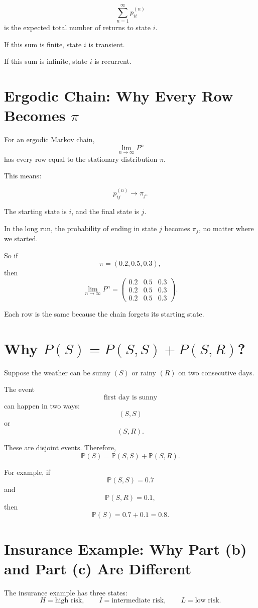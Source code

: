\documentclass[12pt,a4paper]{article}
\theoremstyle{notestyle}
\newcommand{\Prob}{\mathbb{P}}
\begin{document}
\[
\sum_{n=1}^{\infty}p_{ii}^{(n)}
\]
is the expected total number of returns to state $i$.

If this sum is finite, state $i$ is transient.

If this sum is infinite, state $i$ is recurrent.

\section{Ergodic Chain: Why Every Row Becomes $\pi$}

For an ergodic Markov chain,
\[
\lim_{n\to\infty}P^n
\]
has every row equal to the stationary distribution $\pi$.

This means:

\[
p_{ij}^{(n)}\to \pi_j.
\]

The starting state is $i$, and the final state is $j$.

In the long run, the probability of ending in state $j$ becomes $\pi_j$, no matter where we started.

So if
\[
\pi=(0.2,0.5,0.3),
\]
then
\[
\lim_{n\to\infty}P^n
=
\begin{pmatrix}
0.2 & 0.5 & 0.3\\
0.2 & 0.5 & 0.3\\
0.2 & 0.5 & 0.3
\end{pmatrix}.
\]

Each row is the same because the chain forgets its starting state.

\section{Why $P(S)=P(S,S)+P(S,R)$?}

Suppose the weather can be sunny $(S)$ or rainy $(R)$ on two consecutive days.

The event
\[
\text{first day is sunny}
\]
can happen in two ways:
\[
(S,S)
\]
or
\[
(S,R).
\]

These are disjoint events. Therefore,
\[
\Prob(S)=\Prob(S,S)+\Prob(S,R).
\]

For example, if
\[
\Prob(S,S)=0.7
\]
and
\[
\Prob(S,R)=0.1,
\]
then
\[
\Prob(S)=0.7+0.1=0.8.
\]

\section{Insurance Example: Why Part (b) and Part (c) Are Different}

The insurance example has three states:
\[
H=\text{high risk},\qquad I=\text{intermediate risk},\qquad L=\text{low risk}.
\]
\end{document}
